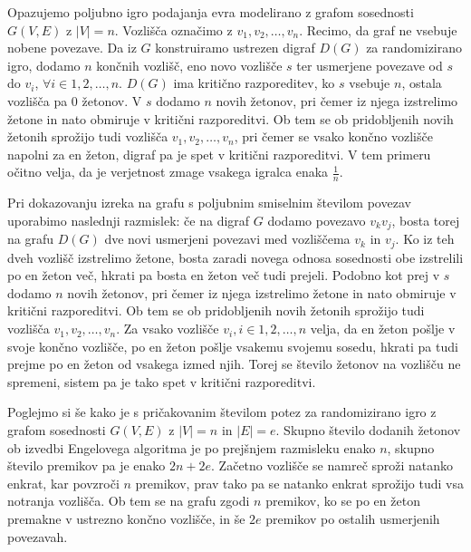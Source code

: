 \documentclass[twoside,11pt]{article}
\begin{document}
\begin{dokaz}
   Opazujemo poljubno igro podajanja evra modelirano z grafom sosednosti $G(V,E)$ z $|V|=n$. Vozlišča označimo z $v_1,v_2,\ldots,v_n$. 
   Recimo, da graf ne vsebuje nobene povezave.
   Da iz $G$ konstruiramo ustrezen digraf $D(G)$ za randomizirano igro, dodamo $n$ končnih vozlišč, eno novo vozlišče $s$ ter usmerjene povezave od $s$ do $v_i$, $ \forall i\in {1,2,\ldots,n}$.
   $D(G)$ ima kritično razporeditev, ko $s$ vsebuje $n$, ostala vozlišča pa $0$ žetonov. V $s$ dodamo $n$ novih žetonov, pri čemer iz njega izstrelimo žetone in nato obmiruje v kritični razporeditvi.
   Ob tem se ob pridobljenih novih žetonih sprožijo tudi vozlišča $v_1,v_2,\ldots,v_n$, pri čemer se vsako končno vozlišče napolni za en žeton, digraf pa je spet v kritični razporeditvi.
   V tem primeru očitno velja, da je verjetnost zmage vsakega igralca enaka $\frac{1}{n}$.

   Pri dokazovanju izreka na grafu s poljubnim smiselnim številom povezav uporabimo naslednji razmislek: če na digraf $G$ dodamo povezavo $v_kv_j$, bosta torej na grafu $D(G)$ dve novi usmerjeni povezavi med vozliščema $v_k$ in $v_j$.
   Ko iz teh dveh vozlišč izstrelimo žetone, bosta zaradi novega odnosa sosednosti obe izstrelili po en žeton več, hkrati pa bosta en žeton več tudi prejeli. Podobno kot prej v $s$ dodamo $n$ novih žetonov, pri čemer iz njega izstrelimo žetone in nato obmiruje v kritični razporeditvi.
   Ob tem se ob pridobljenih novih žetonih sprožijo tudi vozlišča $v_1,v_2,\ldots,v_n$. Za vsako vozlišče $v_i, i\in{1,2,\ldots,n}$ velja, da en žeton pošlje v svoje končno vozlišče, po en žeton pošlje vsakemu svojemu sosedu, hkrati pa tudi prejme po en žeton od vsakega izmed njih.
   Torej se število žetonov na vozlišču ne spremeni, sistem pa je tako spet v kritični razporeditvi.
   \hfill \QED

\end{dokaz}

Poglejmo si še kako je s pričakovanim številom potez za randomizirano igro z grafom sosednosti $G(V,E)$ z $|V|=n$ in $|E|=e$. Skupno število dodanih žetonov ob izvedbi Engelovega algoritma 
je po prejšnjem razmisleku enako $n$, skupno število premikov pa je enako $2n+2e$. Začetno vozlišče se namreč sproži natanko enkrat, kar povzroči $n$ premikov, 
prav tako pa se natanko enkrat sprožijo tudi vsa notranja vozlišča. 
Ob tem se na grafu zgodi $n$ premikov, ko se po en žeton premakne v ustrezno končno vozlišče, in še $2e$ premikov po ostalih usmerjenih povezavah. 
\end{document}
